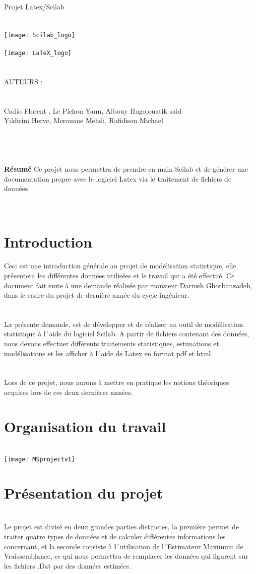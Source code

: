 \documentclass[a4paper,12pt,reqno]{article}
\newcommand{\newparagraphe}[1]{\paragraph{#1}\mbox{}\\}
\begin{document}
\begin{center}
{ \huge Projet Latex/Scilab} 
\newparagraphe{}
\texttt{[image: Scilab\_logo]}
\\
\\
\texttt{[image: LaTeX\_logo]}
\newparagraphe{}
AUTEURS :
\newparagraphe{}
 Cadio Florent , Le Pichon Yann, Albouy Hugo,ouatik said\\ Yildirim Herve, Merouane Mehdi, Rafidison Michael 
\newparagraphe{}
\end{center}
\newparagraphe{}
\textbf{R\'esum\'e} Ce projet nous permettra de prendre en main Scilab et de g\'en\'erer une documentation propre avec le logiciel Latex via le traitement de fichiers de donn\'ees
\pagebreak 
\tableofcontents 
\cleardoublepage
\pagestyle{plain}
\newparagraphe{}
\section{Introduction}
Ceci est une introduction g\'en\'erale au projet de mod\'elisation statistique, elle pr\'esentera les diff\'erentes donn\'ees utilis\'ees et le travail qui a \'et\'e effectu\'e. Ce document fait suite \`{a} une demande r\'ealis\'ee par monsieur Dariush Ghorbanzadeh, dans le cadre du projet de derni\`{e}re ann\'ee du cycle ing\'enieur. 
\newparagraphe{}
La pr\'esente demande, est de d\'evelopper et de r\'ealiser un outil de mod\'elisation statistique \`{a} l\'\ aide du logiciel Scilab. A partir de fichiers contenant des donn\'ees, nous devons effectuer diff\'erents traitements statistiques,  estimations et mod\'elisations et les afficher \`{a} l\'\ aide de Latex en format pdf et html.
\newparagraphe{}
Lors de ce projet, nous aurons \`{a} mettre en pratique  les notions th\'eoriques acquises lors de ces deux derni\`{e}res ann\'ees.
\pagebreak 

\section{Organisation du travail}
\newparagraphe{}
\texttt{[image: MSprojectv1]}\\
\pagebreak 

\section{Pr\'esentation du projet}
\newparagraphe{}

Le projet est divis\'e en deux grandes parties distinctes, la premi\`{e}re permet de traiter quatre types de donn\'ees et de calculer diff\'erentes informations les concernant, et la seconde consiste \`{a} l\'\ utilisation de l\'\ Estimateur Maximum de Vraissemblance, ce qui nous permettra de remplacer les donn\'ees qui figurent sur les fichiers .Dat par des donn\'ees estim\'ees.
\end{document}
